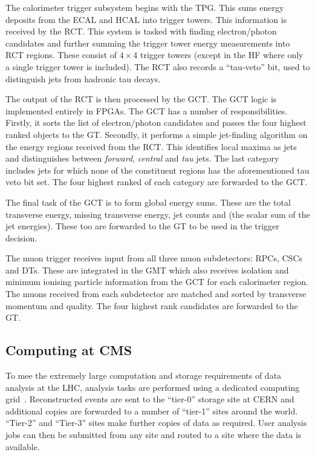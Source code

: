 The calorimeter trigger subsystem begins with the \ac{TPG}. This sums energy
deposits from the \ac{ECAL} and \ac{HCAL} into trigger towers. This information
is received by the \ac{RCT}. This system is tasked with finding electron/photon
candidates and further summing the trigger tower energy measurements into
\ac{RCT} regions. These consist of $4\times 4$ trigger towers (except in the
\ac{HF} where only a single trigger tower is included). The \ac{RCT} also
records a ``tau-veto'' bit, used to distinguish jets from hadronic tau decays.

The output of the \ac{RCT} is then processed by the \ac{GCT}. The \ac{GCT} logic
is implemented entirely in \acp{FPGA}. The \ac{GCT} has a number of
responsibilities. Firstly, it sorts the list of electron/photon candidates and
passes the four highest ranked objects to the \ac{GT}. Secondly, it
performs a simple jet-finding algorithm on the energy regions received from the
\ac{RCT}. This identifies local maxima as jets and distinguishes between
\emph{forward}, \emph{central} and \emph{tau} jets. The last category includes
jets for which none of the constituent regions has the aforementioned tau veto
bit set. The four highest ranked of each category are forwarded to the \ac{GCT}.

The final task of the \ac{GCT} is to form global energy sums. These are the
total transverse energy, missing transverse energy, jet counts and \HT (the
scalar sum of the jet energies). These too are forwarded to the \ac{GT} to be
used in the trigger decision.

The muon trigger receives input from all three muon subdetectors: \acp{RPC},
\acp{CSC} and \acp{DT}. These are integrated in the \ac{GMT} which also receives
isolation and minimum ionising particle information from the \ac{GCT} for each
calorimeter region. The muons received from each subdetector are matched and
sorted by transverse momentum and quality. The four highest rank candidates are
forwarded to the \ac{GT}.

\subsection{Computing at \ac{CMS}}
\label{sec:cms_computing}
To mee the extremely large computation and storage requirements of data analysis
at the \ac{LHC}, analysis tasks are performed using a dedicated computing
grid~\cite{lhc_grid}. Reconstructed events are sent to the ``tier-0'' storage
site at \ac{CERN} and additional copies are forwarded to a number of ``tier-1''
sites around the world. ``Tier-2'' and ``Tier-3'' sites make further copies of
data as required. User analysis jobs can then be submitted from any site and
routed to a site where the data is available.

